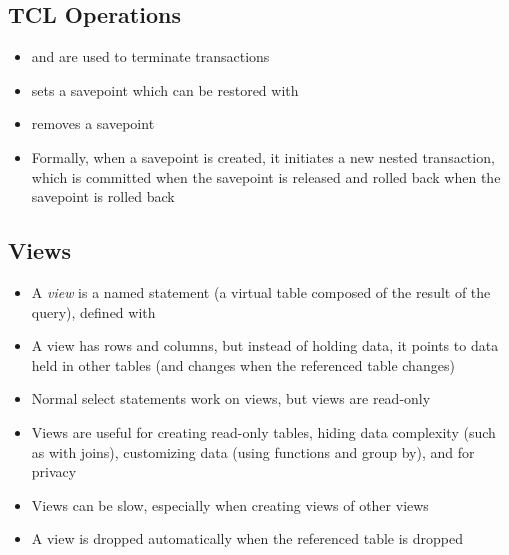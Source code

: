 \documentclass[a4paper]{article}
\begin{document}
\subsection{TCL Operations}

\begin{itemize}
\item {} and  are used to terminate transactions
\item {} sets a savepoint which can be restored with 
\item {} removes a savepoint
\item Formally, when a savepoint is created, it initiates a new nested transaction, which is committed when the savepoint is released and rolled back when the savepoint is rolled back
\end{itemize}

\subsection{Views}
\begin{itemize}
    \item A \emph{view} is a named  statement (a virtual table composed of the result of the query), defined with 
    \item A view has rows and columns, but instead of holding data, it points to data held in other tables (and changes when the referenced table changes)
    \item Normal select statements work on views, but views are read-only
    \item Views are useful for creating read-only tables, hiding data complexity (such as with joins), customizing data (using functions and group by), and for privacy
    \item Views can be slow, especially when creating views of other views
    \item A view is dropped automatically when the referenced table is dropped
\end{itemize}
\end{document}
